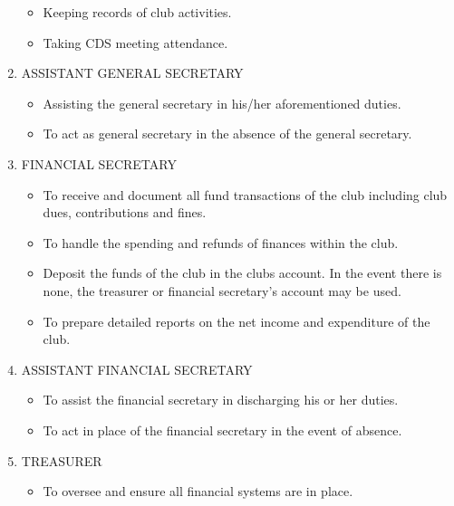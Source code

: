 \documentclass{report}
\begin{document}
\begin{enumerate}
\begin{itemize}
    \item 
    Keeping records of club activities.
    
    \item 
    Taking CDS meeting attendance.
\end{itemize}

    \item ASSISTANT GENERAL SECRETARY
        \begin{itemize}
    \item 
    Assisting the general secretary in his/her aforementioned duties.
    
    \item 
    To act as general secretary in the absence of the general secretary.
\end{itemize}

    \item FINANCIAL SECRETARY
        \begin{itemize}
    \item 
    To receive and document all fund transactions of the club including club dues, contributions and fines.
    
    \item 
    To handle the spending and refunds of finances within the club.
    
    \item 
    Deposit the funds of the club in the clubs account. In the event there is none, the treasurer or financial secretary’s account may be used.

    \item 
    To prepare detailed reports on the net income and expenditure of the club.

\end{itemize}

    \item ASSISTANT FINANCIAL SECRETARY
        \begin{itemize}
    \item 
    To assist the financial secretary in discharging his or her duties.
    
    \item 
    To act in place of the financial secretary in the event of absence.

\end{itemize}

    \item TREASURER
        \begin{itemize}
    \item 
    To oversee and ensure all financial systems are in place.
    

\end{itemize}
\end{enumerate}
\end{document}
